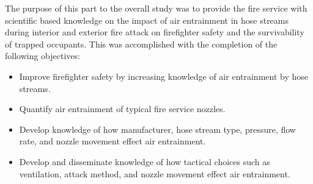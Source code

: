 \documentclass[12pt,oneside]{book}
\begin{document}
The purpose of this part to the overall study was to provide the fire service with scientific based knowledge on the impact of air entrainment in hose streams during interior and exterior fire attack on firefighter safety and the survivability of trapped occupants. This was accomplished with the completion of the following objectives:

\begin{itemize}
	\item Improve firefighter safety by increasing knowledge of air entrainment by hose streams.
	\item Quantify air entrainment of typical fire service nozzles. 
	\item Develop knowledge of how manufacturer, hose stream type, pressure, flow rate, and nozzle movement effect air entrainment.
	\item Develop and disseminate knowledge of how tactical choices such as ventilation, attack method, and nozzle movement effect air entrainment. 
	\end{itemize}






\end{document}

